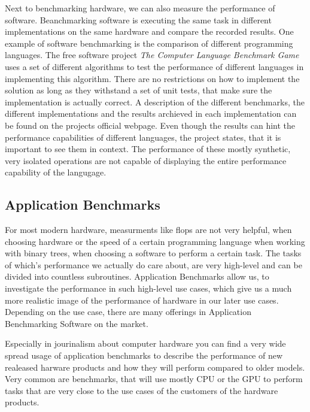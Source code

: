 Next to benchmarking hardware, we can also measure the performance of software.
Beanchmarking software is executing the same task in different implementations
on the same hardware and compare the recorded results. One example of software
benchmarking is the comparison of different programming languages. The free
software project \emph{The Computer Language Benchmark Game} uses a set of
different algorithms to test the performance of different languages in
implementing this algorithm. There are no restrictions on how to implement the
solution as long as they withstand a set of unit tests, that make sure the
implementation is actually correct. A description of the different benchmarks,
the different implementations and the results archieved in each implementation
can be found on the projects official webpage.  Even though the results can hint
the performance capabilities of different languages, the project states, that it
is important to see them in context. The performance of these mostly synthetic,
very isolated operations are not capable of displaying the entire performance
capability of the langugage.
\cite{CompLangBenchmGame}





\subsection{Application Benchmarks}

For most modern hardware, measurments like \gls{flops} are not very helpful,
when choosing hardware or the speed of a certain programming language when
working with binary trees, when choosing a software to perform a certain task.
The tasks of which's performance we actually do care about, are very high-level
and can be divided into countless subroutines. Application Benchmarks allow us,
to investigate the performance in such high-level use cases, which give us a
much more realistic image of the performance of hardware in our later use cases.
Depending on the use case, there are many offerings in Application Benchmarking
Software on the market.

Especially in jourinalism about computer hardware you can find a very wide
spread usage of application benchmarks to describe the performance of new
realeased harware products and how they will perform compared to older models.
Very common are benchmarks, that will use mostly CPU or the GPU to perform tasks
that are very close to the use cases of the customers of the hardware products.





